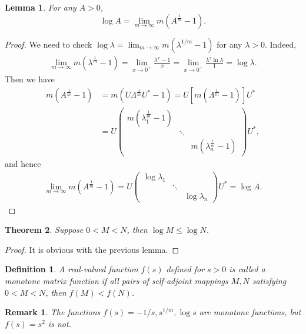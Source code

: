 \documentclass[10pt]{book}
\newtheorem{definition}{Definition}[chapter]
\newtheorem{theorem}{Theorem}[chapter]
\newtheorem{lemma}[theorem]{Lemma}
\newtheorem{remark}{Remark}[chapter]
\theoremstyle{definition}
\numberwithin{equation}{chapter}
\begin{document}
\begin{lemma}
For any $A > 0$, $$\log A = \lim_{m\to\infty} m \left(A^{\frac{1}{m}} - 1\right).$$
\end{lemma}
\begin{proof}
We need to check $\log \lambda = \lim_{m\to\infty} m \left(\lambda^{1/m} - 1\right)$ for any $\lambda > 0$. Indeed, 
\begin{align*}
    \lim_{m\to\infty} m \left(\lambda^{\frac{1}{m}} - 1\right) = \lim_{x\to 0^+} \frac{\lambda^x - 1}{x} = \lim_{x\to 0^+} \frac{\lambda^x \ln \lambda }{1} = \log \lambda. 
\end{align*}
Then we have
\begin{align*}
    m \left(A^{\frac{1}{m}} - 1\right) & = m \left( U \Lambda^{\frac{1}{m}} U^* - 1 \right) = U \left[m \left(\Lambda^{\frac{1}{m}} - 1\right)\right] U^* \\
    & = U \begin{pmatrix}
        m \left(\lambda_1^{\frac{1}{m}} - 1\right) &  & \\
        & \ddots & \\
        &  & m \left(\lambda_n^{\frac{1}{m}} - 1\right)
    \end{pmatrix} U^*,
\end{align*}
and hence 
\begin{align*}
    \lim_{m\to\infty} m \left(A^{\frac{1}{m}} - 1\right) = U \begin{pmatrix}
        \log \lambda_1 &  & \\
        & \ddots & \\
        &  & \log \lambda_n
    \end{pmatrix} U^* = \log A.
\end{align*}
\end{proof}

\medskip

\begin{theorem}
Suppose $0 < M < N$, then $\log M \leq \log N$.
\end{theorem}
\begin{proof}
It is obvious with the previous lemma.
\end{proof}

\medskip

\begin{definition}
A real-valued function $f(s)$ defined for $s > 0$ is called a monotone matrix function if all pairs of self-adjoint mappings $M, N$ satisfying $0 < M < N$, then $f(M) < f(N)$. 
\end{definition}
\begin{remark}
The functions $f(s) = - 1/s, s^{1/m}, \log s$ are monotone functions, but $f(s) = s^2$ is not.
\end{remark}
\end{document}

